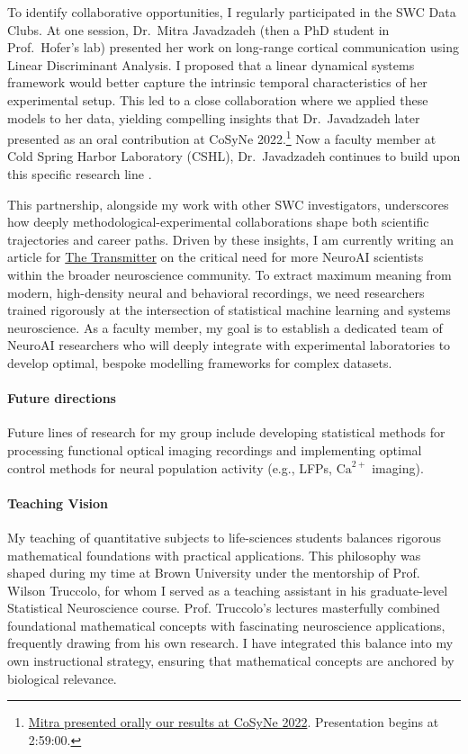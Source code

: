 \documentclass{article}
\begin{document}
To identify collaborative opportunities, I regularly participated in the SWC
Data Clubs. At one session, Dr.~Mitra Javadzadeh (then a PhD student in
Prof.~Hofer's lab) presented her work on long-range cortical communication
using Linear Discriminant Analysis. I proposed that a linear dynamical systems
framework would better capture the intrinsic temporal characteristics of her
experimental setup. This led to a close collaboration where we applied these
models to her data, yielding compelling insights that Dr.~Javadzadeh later
presented as an oral contribution at CoSyNe
2022.\footnote{\href{https://www.youtube.com/watch?v=lG1Rn4AwmY8}{Mitra
presented orally our results at CoSyNe 2022}. Presentation begins at 2:59:00.}
Now a faculty member at Cold Spring Harbor Laboratory (CSHL), Dr.~Javadzadeh
continues to build upon this specific research line \citep{javadzadehEtAl24}.

This partnership, alongside my work with other SWC investigators, underscores
how deeply methodological-experimental collaborations shape both scientific
trajectories and career paths. Driven by these insights, I am currently writing
an article for \href{https://www.thetransmitter.org/}{The Transmitter} on the
critical need for more NeuroAI scientists within the broader neuroscience
community. To extract maximum meaning from modern, high-density neural and
behavioral recordings, we need researchers trained rigorously at the
intersection of statistical machine learning and systems neuroscience. As a
faculty member, my goal is to establish a dedicated team of NeuroAI researchers
who will deeply integrate with experimental laboratories to develop optimal,
bespoke modelling frameworks for complex datasets.

\paragraph{Future directions} Future lines of research for my group include
developing statistical methods for processing functional optical imaging
recordings and implementing optimal control methods for neural population
activity (e.g., LFPs, $\text{Ca}^{2+}$ imaging).

\paragraph{Teaching Vision}

My teaching of quantitative subjects to life-sciences students balances
rigorous mathematical foundations with practical applications. This philosophy
was shaped during my time at Brown University under the mentorship of Prof.
Wilson Truccolo, for whom I served as a teaching assistant in his
graduate-level Statistical Neuroscience course. Prof. Truccolo’s lectures
masterfully combined foundational mathematical concepts with fascinating
neuroscience applications, frequently drawing from his own research.  I have
integrated this balance into my own instructional strategy, ensuring that
mathematical concepts are anchored by biological relevance.
\end{document}
